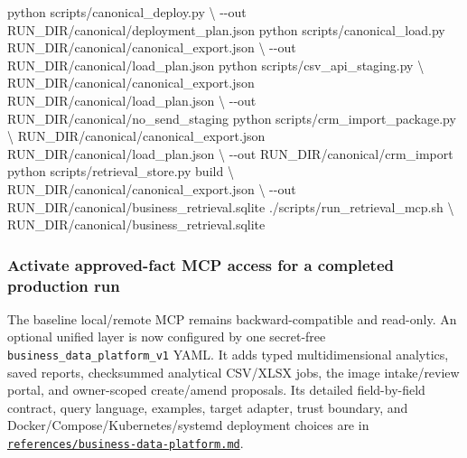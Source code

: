 \documentclass[
]{article}
\newenvironment{Shaded}{}{}
\newcommand{\AttributeTok}[1]{\textcolor[rgb]{0.49,0.56,0.16}{#1}}
\newcommand{\DataTypeTok}[1]{\textcolor[rgb]{0.56,0.13,0.00}{#1}}
\newcommand{\ExtensionTok}[1]{#1}
\newcommand{\NormalTok}[1]{#1}
\begin{document}
\begin{Shaded}
\begin{Highlighting}[]
\ExtensionTok{python}\NormalTok{ scripts/canonical\_deploy.py }\DataTypeTok{\textbackslash{}}
  \AttributeTok{{-}{-}out}\NormalTok{ RUN\_DIR/canonical/deployment\_plan.json}
\ExtensionTok{python}\NormalTok{ scripts/canonical\_load.py RUN\_DIR/canonical/canonical\_export.json }\DataTypeTok{\textbackslash{}}
  \AttributeTok{{-}{-}out}\NormalTok{ RUN\_DIR/canonical/load\_plan.json}
\ExtensionTok{python}\NormalTok{ scripts/csv\_api\_staging.py }\DataTypeTok{\textbackslash{}}
\NormalTok{  RUN\_DIR/canonical/canonical\_export.json RUN\_DIR/canonical/load\_plan.json }\DataTypeTok{\textbackslash{}}
  \AttributeTok{{-}{-}out}\NormalTok{ RUN\_DIR/canonical/no\_send\_staging}
\ExtensionTok{python}\NormalTok{ scripts/crm\_import\_package.py }\DataTypeTok{\textbackslash{}}
\NormalTok{  RUN\_DIR/canonical/canonical\_export.json RUN\_DIR/canonical/load\_plan.json }\DataTypeTok{\textbackslash{}}
  \AttributeTok{{-}{-}out}\NormalTok{ RUN\_DIR/canonical/crm\_import}
\ExtensionTok{python}\NormalTok{ scripts/retrieval\_store.py build }\DataTypeTok{\textbackslash{}}
\NormalTok{  RUN\_DIR/canonical/canonical\_export.json }\DataTypeTok{\textbackslash{}}
  \AttributeTok{{-}{-}out}\NormalTok{ RUN\_DIR/canonical/business\_retrieval.sqlite}
\ExtensionTok{./scripts/run\_retrieval\_mcp.sh} \DataTypeTok{\textbackslash{}}
\NormalTok{  RUN\_DIR/canonical/business\_retrieval.sqlite}
\end{Highlighting}
\end{Shaded}

\subsubsection{Activate approved-fact MCP access for a completed
production
run}\label{activate-approved-fact-mcp-access-for-a-completed-production-run}

The baseline local/remote MCP remains backward-compatible and read-only.
An optional unified layer is now configured by one secret-free
\texttt{business\_\allowbreak{}data\_\allowbreak{}platform\_\allowbreak{}v1}
YAML. It adds typed multidimensional analytics, saved reports,
checksummed analytical CSV/XLSX jobs, the image intake/review portal,
and owner-scoped create/amend proposals. Its detailed field-by-field
contract, query language, examples, target adapter, trust boundary, and
Docker/Compose/Kubernetes/systemd deployment choices are in
\href{../references/business-data-platform.md}{\texttt{references/\allowbreak{}business-\allowbreak{}data-\allowbreak{}platform.md}}.
\end{document}
